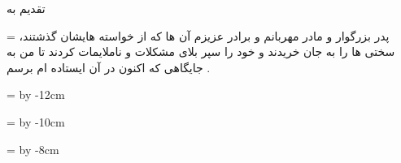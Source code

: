 \thispagestyle{empty}
\vtitle
%
\newpage
\begin{acknowledgementpage}

\vspace{4cm}

{\nastaliq
{\Large
 تقدیم به
\vspace{1.5cm}

\newdimen\xa
\xa=\textwidth
پدر بزرگوار و مادر مهربانم و برادر عزیزم 
\newline
آن ها که از خواسته هایشان گذشتند، سختی ها را به جان خریدند و خود را سپر بلای مشکلات و ناملایمات کردند تا من به جایگاهی که اکنون در آن ایستاده ام برسم .



\newdimen\xa
\xa=\textwidth
\advance \xa by -12cm
\hspace{\xa}
\vspace{1.5cm}

\newdimen\xa
\xa=\textwidth
\advance \xa by -10cm
\hspace{\xa}

\vspace{1.5cm}

\newdimen\xa
\xa=\textwidth
\advance \xa by -8cm
\hspace{\xa}
}}
\end{acknowledgementpage}
% 
% 
